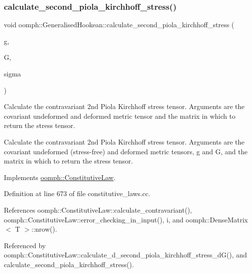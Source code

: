 \subsubsection{\texorpdfstring{calculate\+\_\+second\+\_\+piola\+\_\+kirchhoff\+\_\+stress()}{calculate\_second\_piola\_kirchhoff\_stress()}\hspace{0.1cm}{\footnotesize\ttfamily [1/3]}}
{\footnotesize\ttfamily void oomph\+::\+Generalised\+Hookean\+::calculate\+\_\+second\+\_\+piola\+\_\+kirchhoff\+\_\+stress (\begin{DoxyParamCaption}\item[{const \hyperlink{classoomph_1_1DenseMatrix}{Dense\+Matrix}$<$ double $>$ \&}]{g,  }\item[{const \hyperlink{classoomph_1_1DenseMatrix}{Dense\+Matrix}$<$ double $>$ \&}]{G,  }\item[{\hyperlink{classoomph_1_1DenseMatrix}{Dense\+Matrix}$<$ double $>$ \&}]{sigma }\end{DoxyParamCaption})\hspace{0.3cm}{\ttfamily [virtual]}}



Calculate the contravariant 2nd Piola Kirchhoff stress tensor. Arguments are the covariant undeformed and deformed metric tensor and the matrix in which to return the stress tensor. 

Calculate the contravariant 2nd Piola Kirchhoff stress tensor. Arguments are the covariant undeformed (stress-\/free) and deformed metric tensors, g and G, and the matrix in which to return the stress tensor. 

Implements \hyperlink{classoomph_1_1ConstitutiveLaw_a93527d910de908035feb8f41b0401065}{oomph\+::\+Constitutive\+Law}.



Definition at line 673 of file constitutive\+\_\+laws.\+cc.



References oomph\+::\+Constitutive\+Law\+::calculate\+\_\+contravariant(), oomph\+::\+Constitutive\+Law\+::error\+\_\+checking\+\_\+in\+\_\+input(), i, and oomph\+::\+Dense\+Matrix$<$ T $>$\+::nrow().



Referenced by oomph\+::\+Constitutive\+Law\+::calculate\+\_\+d\+\_\+second\+\_\+piola\+\_\+kirchhoff\+\_\+stress\+\_\+d\+G(), and calculate\+\_\+second\+\_\+piola\+\_\+kirchhoff\+\_\+stress().

\mbox{\label{classoomph_1_1GeneralisedHookean_a641d0893e485df52b48b15e189a850ed}} 
